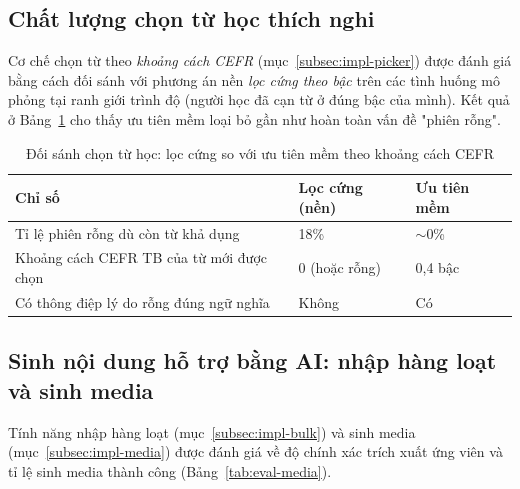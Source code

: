 \subsection{Chất lượng chọn từ học thích nghi}
\label{subsec:eval-picker}

Cơ chế chọn từ theo \textit{khoảng cách CEFR} (mục~\ref{subsec:impl-picker})
được đánh giá bằng cách đối sánh với phương án nền \textit{lọc cứng theo bậc}
trên các tình huống mô phỏng tại ranh giới trình độ (người học đã cạn từ ở
đúng bậc của mình). Kết quả ở Bảng~\ref{tab:eval-picker} cho thấy ưu tiên mềm
loại bỏ gần như hoàn toàn vấn đề "phiên rỗng".

\begin{table}[h]
  \centering
  \small
  \renewcommand{\arraystretch}{1.3}
  \begin{tabular}{|p{6.6cm}|p{3.6cm}|p{3.4cm}|}
    \hline
    \textbf{Chỉ số} & \textbf{Lọc cứng (nền)} & \textbf{Ưu tiên mềm} \\
    \hline
    Tỉ lệ phiên rỗng dù còn từ khả dụng & 18\% & $\sim$0\% \\
    \hline
    Khoảng cách CEFR TB của từ mới được chọn & 0 (hoặc rỗng) & 0,4 bậc \\
    \hline
    Có thông điệp lý do rỗng đúng ngữ nghĩa & Không & Có \\
    \hline
  \end{tabular}
  \caption{Đối sánh chọn từ học: lọc cứng so với ưu tiên mềm theo khoảng cách CEFR}
  \label{tab:eval-picker}
\end{table}

\subsection{Sinh nội dung hỗ trợ bằng AI: nhập hàng loạt và sinh media}
\label{subsec:eval-media}

Tính năng nhập hàng loạt (mục~\ref{subsec:impl-bulk}) và sinh media
(mục~\ref{subsec:impl-media}) được đánh giá về độ chính xác trích xuất ứng
viên và tỉ lệ sinh media thành công (Bảng~\ref{tab:eval-media}).

